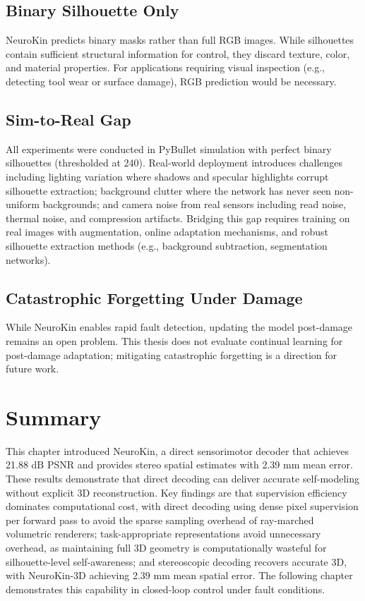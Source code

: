 \documentclass[12pt,a4paper,oneside]{report}
\begin{document}
\subsection{Binary Silhouette Only}

NeuroKin predicts binary masks rather than full RGB images. While silhouettes contain sufficient structural information for control, they discard texture, color, and material properties. For applications requiring visual inspection (e.g., detecting tool wear or surface damage), RGB prediction would be necessary.

\subsection{Sim-to-Real Gap}

All experiments were conducted in PyBullet simulation with perfect binary silhouettes (thresholded at 240). Real-world deployment introduces challenges including lighting variation where shadows and specular highlights corrupt silhouette extraction; background clutter where the network has never seen non-uniform backgrounds; and camera noise from real sensors including read noise, thermal noise, and compression artifacts. Bridging this gap requires training on real images with augmentation, online adaptation mechanisms, and robust silhouette extraction methods (e.g., background subtraction, segmentation networks).

\subsection{Catastrophic Forgetting Under Damage}

While NeuroKin enables rapid fault detection, updating the model post-damage remains an open problem. This thesis does not evaluate continual learning for post-damage adaptation; mitigating catastrophic forgetting is a direction for future work.

\section{Summary}

This chapter introduced NeuroKin, a direct sensorimotor decoder that achieves 21.88 dB PSNR and provides stereo spatial estimates with 2.39 mm mean error. These results demonstrate that direct decoding can deliver accurate self-modeling without explicit 3D reconstruction. Key findings are that supervision efficiency dominates computational cost, with direct decoding using dense pixel supervision per forward pass to avoid the sparse sampling overhead of ray-marched volumetric renderers; task-appropriate representations avoid unnecessary overhead, as maintaining full 3D geometry is computationally wasteful for silhouette-level self-awareness; and stereoscopic decoding recovers accurate 3D, with NeuroKin-3D achieving 2.39 mm mean spatial error. The following chapter demonstrates this capability in closed-loop control under fault conditions.
\end{document}

